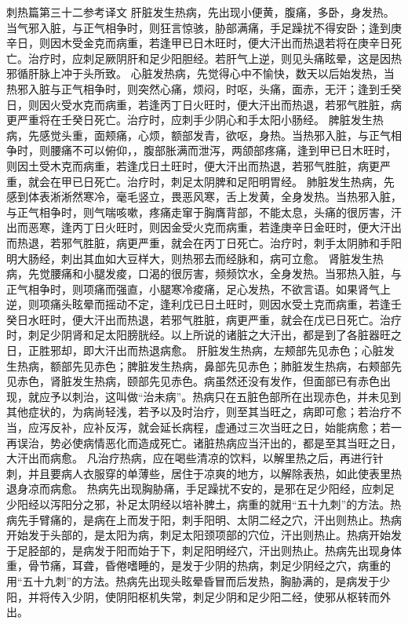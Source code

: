 \documentclass[12pt,UTF8]{ctexbook}
\begin{document}
刺热篇第三十二参考译文
肝脏发生热病，先出现小便黄，腹痛，多卧，身发热。当气邪入脏，与正气相争时，则狂言惊骇，胁部满痛，手足躁扰不得安卧；逢到庚辛日，则因木受金克而病重，若逢甲已日木旺时，便大汗出而热退若将在庚辛日死亡。治疗时，应刺足厥阴肝和足少阳胆经。若肝气上逆，则见头痛眩晕，这是因热邪循肝脉上冲于头所致。
心脏发热病，先觉得心中不愉快，数天以后始发热，当热邪入脏与正气相争时，则突然心痛，烦闷，时呕，头痛，面赤，无汗；逢到壬癸日，则因火受水克而病重，若逢丙丁日火旺时，便大汗出而热退，若邪气胜脏，病更严重将在壬癸日死亡。治疗时，应刺手少阴心和手太阳小肠经。
脾脏发生热病，先感觉头重，面颊痛，心烦，额部发青，欲呕，身热。当热邪入脏，与正气相争时，则腰痛不可以俯仰，，腹部胀满而泄泻，两颌部疼痛，逢到甲已日木旺时，则因土受木克而病重，若逢戊日土旺时，便大汗出而热退，若邪气胜脏，病更严重，就会在甲已日死亡。治疗时，刺足太阴脾和足阳明胃经。
肺脏发生热病，先感到体表淅淅然寒冷，毫毛竖立，畏恶风寒，舌上发黄，全身发热。当热邪入脏，与正气相争时，则气喘咳嗽，疼痛走窜于胸膺背部，不能太息，头痛的很厉害，汗出而恶寒，逢丙丁日火旺时，则因金受火克而病重，若逢庚辛日金旺时，便大汗出而热退，若邪气胜脏，病更严重，就会在丙丁日死亡。治疗时，刺手太阴肺和手阳明大肠经，刺出其血如大豆样大，则热邪去而经脉和，病可立愈。
肾脏发生热病，先觉腰痛和小腿发痠，口渴的很厉害，频频饮水，全身发热。当邪热入脏，与正气相争时，则项痛而强直，小腿寒冷痠痛，足心发热，不欲言语。如果肾气上逆，则项痛头眩晕而摇动不定，逢利戊已日土旺时，则因水受土克而病重，若逢壬癸日水旺时，便大汗出而热退，若邪气胜脏，病更严重，就会在戊已日死亡。治疗时，刺足少阴肾和足太阳膀胱经。以上所说的诸脏之大汗出，都是到了各脏器旺之日，正胜邪却，即大汗出而热退病愈。
肝脏发生热病，左颊部先见赤色；心脏发生热病，额部先见赤色；脾脏发生热病，鼻部先见赤色；肺脏发生热病，右颊部先见赤色，肾脏发生热病，颐部先见赤色。病虽然还没有发作，但面部已有赤色出现，就应予以刺治，这叫做“治未病”。热病只在五脏色部所在出现赤色，并未见到其他症状的，为病尚轻浅，若予以及时治疗，则至其当旺之，病即可愈；若治疗不当，应泻反补，应补反泻，就会延长病程，虚通过三次当旺之日，始能病愈；若一再误治，势必使病情恶化而造成死亡。诸脏热病应当汗出的，都是至其当旺之日，大汗出而病愈。
凡治疗热病，应在喝些清凉的饮料，以解里热之后，再进行针刺，并且要病人衣服穿的单薄些，居住于凉爽的地方，以解除表热，如此使表里热退身凉而病愈。
热病先出现胸胁痛，手足躁扰不安的，是邪在足少阳经，应刺足少阳经以泻阳分之邪，补足太阴经以培补脾土，病重的就用“五十九刺”的方法。热病先手臂痛的，是病在上而发于阳，刺手阳明、太阴二经之穴，汗出则热止。热病开始发于头部的，是太阳为病，刺足太阳颈项部的穴位，汗出则热止。热病开始发于足胫部的，是病发于阳而始于下，刺足阳明经穴，汗出则热止。热病先出现身体重，骨节痛，耳聋，昏倦嗜睡的，是发于少阴的热病，刺足少阴经之穴，病重的用“五十九刺”的方法。热病先出现头眩晕昏冒而后发热，胸胁满的，是病发于少阳，并将传入少阴，使阴阳枢机失常，刺足少阴和足少阳二经，使邪从枢转而外出。
\end{document}

